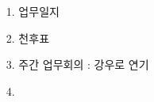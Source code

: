 \documentclass[25pt, a1paper ]{tikzposter}
\begin{document}
\begin{columns}
%





			{				
			\setlength{\leftmargini}{7em}			
			\setlength{\labelsep}{1em} %

			\begin{LARGE}
			\begin{itemize}
			\item [1.] 업무일지
			\item [2.] 천후표 
			\item [3.] 주간 업무회의 : 강우로 연기
			\item [4.] 

			\end{itemize}
			\end{LARGE}
		}


%



\end{columns}
\end{document}
